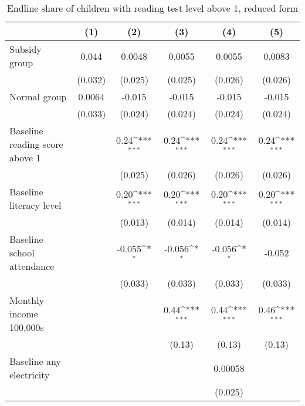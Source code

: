 \begin{table}[htbp]\centering
\def\sym#1{\ifmmode^{#1}\else\(^{#1}\)\fi}
\caption{Endline share of children with reading test level above 1, reduced form}
\begin{tabular*}{1\hsize}{@{\hskip\tabcolsep\extracolsep\fill}l*{5}{c}}
\toprule
                &\multicolumn{1}{c}{(1)}         &\multicolumn{1}{c}{(2)}         &\multicolumn{1}{c}{(3)}         &\multicolumn{1}{c}{(4)}         &\multicolumn{1}{c}{(5)}         \\
\midrule
Subsidy group   &    0.044         &   0.0048         &   0.0055         &   0.0055         &   0.0083         \\
                &  (0.032)         &  (0.025)         &  (0.025)         &  (0.026)         &  (0.026)         \\
Normal group    &   0.0064         &   -0.015         &   -0.015         &   -0.015         &   -0.015         \\
                &  (0.033)         &  (0.024)         &  (0.024)         &  (0.024)         &  (0.024)         \\
Baseline reading score above 1&                  &     0.24\sym{***}&     0.24\sym{***}&     0.24\sym{***}&     0.24\sym{***}\\
                &                  &  (0.025)         &  (0.026)         &  (0.026)         &  (0.026)         \\
Baseline literacy level&                  &     0.20\sym{***}&     0.20\sym{***}&     0.20\sym{***}&     0.20\sym{***}\\
                &                  &  (0.013)         &  (0.014)         &  (0.014)         &  (0.014)         \\
Baseline school attendance&                  &   -0.055\sym{*}  &   -0.056\sym{*}  &   -0.056\sym{*}  &   -0.052         \\
                &                  &  (0.033)         &  (0.033)         &  (0.033)         &  (0.033)         \\
Monthly income 100,000s&                  &                  &     0.44\sym{***}&     0.44\sym{***}&     0.46\sym{***}\\
                &                  &                  &   (0.13)         &   (0.13)         &   (0.13)         \\
Baseline any electricity&                  &                  &                  &  0.00058         &                  \\
                &                  &                  &                  &  (0.025)         &                  \\

\end{tabular*}
\end{table}
